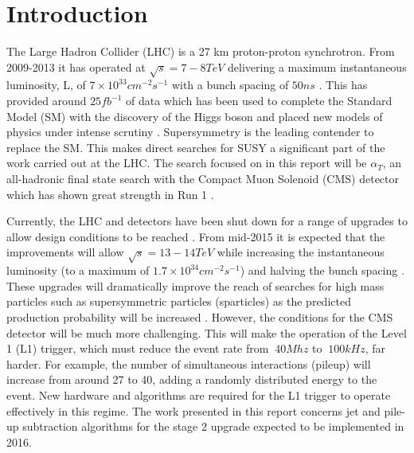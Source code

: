 
\chapter{Introduction} %

\label{Chapter1} %


The Large Hadron Collider (LHC) is a 27 km proton-proton synchrotron. From 2009-2013 it has operated at $\sqrt{s}=7-8TeV$ delivering a maximum instantaneous luminosity, L, of $7 \times 10^{33} cm^{-2}s^{-1}$ with a bunch spacing of $50ns$ \cite{run1}. This has provided around $25fb^{-1}$ of data which has been used to complete the Standard Model (SM) with the discovery of the Higgs boson and placed new models of physics under intense scrutiny \cite{cmshiggs}\cite{atlashiggs}\cite{susyr1}. Supersymmetry is the leading contender to replace the SM. This makes direct searches for SUSY a significant part of the work carried out at the LHC. The search focused on in this report will be $\alpha_T$, an all-hadronic final state search with the Compact Muon Solenoid (CMS) detector which has shown great strength in Run 1 \cite{search}. 

Currently, the LHC and detectors have been shut down for a range of upgrades to allow design conditions to be reached \cite{ls1}. From mid-2015 it is expected that the improvements will allow $\sqrt{s}=13-14TeV$ while increasing the instantaneous luminosity (to a maximum of $1.7\times10^34cm^{-2}s^{-1}$) and halving the bunch spacing \cite{HighLumi}. These upgrades will dramatically improve the reach of searches for high mass particles such as supersymmetric particles (sparticles) as the predicted production probability will be increased \cite{ProjectedCx} . However, the conditions for the CMS detector will be much more challenging.  This will make the operation of the Level 1 (L1) trigger, which must reduce the event rate from $~40Mhz$ to $~100kHz$, far harder. For example, the number of simultaneous interactions (pileup) will increase from around 27 to 40, adding a randomly distributed energy to the event. New hardware and algorithms are required for the L1 trigger to operate effectively in this regime. The work presented in this report concerns jet and pile-up subtraction algorithms for the stage 2 upgrade expected to be implemented in 2016.  










